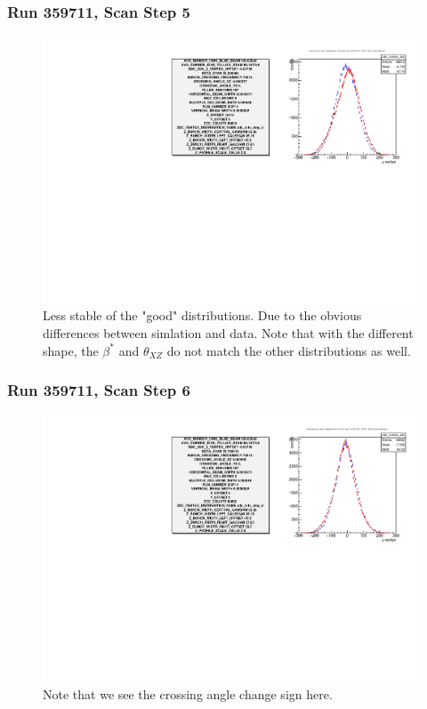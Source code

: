 \begin{frame}
\frametitle{Run 359711, Scan Step 5}
\begin{figure}
\begin{center}
\includegraphics[width=\linewidth]{"figures/359711_step_5_zdc_zvertex"}
\caption{Less stable of the "good" distributions. Due to the obvious differences between simlation and data. Note that with the different shape, the $\beta^*$ and $\theta_{XZ}$ do not match the other distributions as well.}
\label{fig:359711_step_5_zdc_zvertex}
\end{center}\end{figure}
\end{frame}

\begin{frame}
\frametitle{Run 359711, Scan Step 6}
\begin{figure}
\begin{center}
\includegraphics[width=\linewidth]{"figures/359711_step_6_zdc_zvertex"}
\caption{Note that we see the crossing angle change sign here.}
\label{fig:359711_step_6_zdc_zvertex}
\end{center}\end{figure}
\end{frame}

